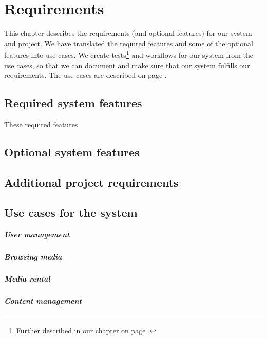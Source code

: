 \chapter{Requirements}
\label{Requirements}
This chapter describes the requirements (and optional features) for our system and project. We have translated the required features and some of the optional features into use cases. We create tests\footnote{Further described in our  chapter on page \pageref{Testing}.} and workflows for our system from the use cases, so that we can document and make sure that our system fulfills our requirements. The use cases are described on page \pageref{Requirements_UC}.
\section{Required system features}
\label{Requirements_Rfeatures}
These required features
\begin{my_itemize}
\item 
\end{my_itemize}
\section{Optional system features}
\label{Requirements_Ofeatures}

\section{Additional project requirements}

\section{Use cases for the system}
\label{Requirements_UC}
\paragraph{User management}
\begin{my_itemize}
\item 
\end{my_itemize}
\paragraph{Browsing media}
\begin{my_itemize}
\item 
\end{my_itemize}
\paragraph{Media rental}
\begin{my_itemize}
\item 
\end{my_itemize}
\paragraph{Content management}
\begin{my_itemize}
\item 
\end{my_itemize}